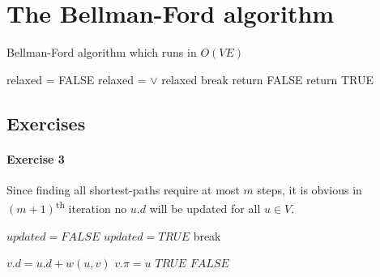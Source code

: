 \documentclass{book}
\begin{document}
	\section{The Bellman-Ford algorithm}		
		\begin{algorithm}[h!]
			\caption{Bellman-Ford algorithm which runs in $O(VE)$}
			\begin{algorithmic}[1]
					\State {}
						\State relaxed = FALSE
							\State relaxed =  $\lor$ relaxed
						\EndFor
							\State break
						\EndIf
					\EndFor
							\State return FALSE
						\EndIf
					\EndFor
					\State return TRUE
				\EndFunction
			\end{algorithmic}
		\end{algorithm}
		\FloatBarrier	
	\subsection{Exercises}
	\paragraph{Exercise 3}
	Since finding all shortest-paths require at most $m$ steps, it is obvious in $(m + 1)$\textsuperscript{th} iteration no $u.d$ will be updated for all $u \in V$.
	\begin{algorithm*}[h!]
		\begin{algorithmic}[1]
				\State {}
					\State $updated = FALSE$
							\State $updated = TRUE$
						\EndIf
					\EndFor
						\State break
					\EndIf
				\EndFor
			\EndFunction
		\end{algorithmic}
	\end{algorithm*}
	\begin{algorithm*}[h!]
		\begin{algorithmic}
					\State $v.d = u.d + w(u, v)$
					\State $v.\pi = u$
					\State \Return $TRUE$
				\Else
					\State \Return $FALSE$
				\EndIf
			\EndFunction
		\end{algorithmic}
	\end{algorithm*}
	\FloatBarrier
\end{document}
